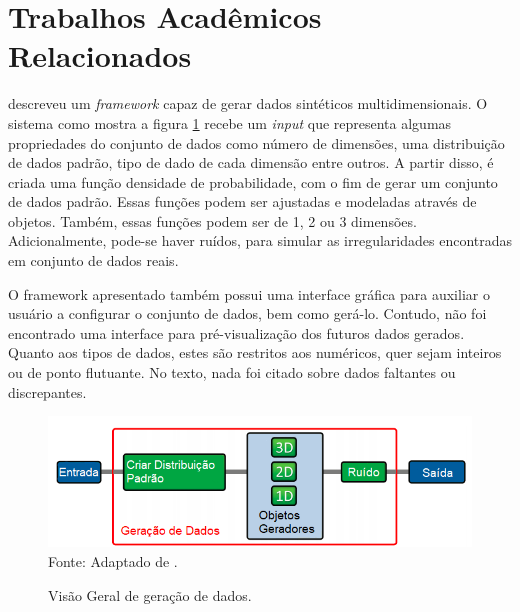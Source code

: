 \documentclass[
	12pt,				%
	openright,			%
	oneside,			%
	a4paper,			%
	english,			%
	brazil				%
	]{abntex2}
\begin{document}
	\section{Trabalhos Acadêmicos Relacionados}
		\cite{albuquerque2011synthetic} descreveu um \emph{framework} capaz de gerar dados sintéticos multidimensionais.
		O sistema como mostra a figura \ref{fig:albuquerque} recebe um \emph{input} que representa algumas propriedades do conjunto de dados como número de dimensões,
			uma distribuição de dados padrão,
			tipo de dado de cada dimensão entre outros.
		A partir disso, é criada uma função densidade de probabilidade, com o fim de gerar um conjunto de dados padrão.
		Essas funções podem ser ajustadas e modeladas através de objetos.
		Também, essas funções podem ser de 1, 2 ou 3 dimensões.
		Adicionalmente, pode-se haver ruídos, para simular as irregularidades encontradas em conjunto de dados reais.
		\par
		O framework apresentado também possui uma interface gráfica para auxiliar o usuário a configurar o conjunto de dados, bem como gerá-lo. 
		Contudo, não foi encontrado uma interface para pré-visualização dos futuros dados gerados.
		Quanto aos tipos de dados, estes são restritos aos numéricos, quer sejam inteiros ou de ponto flutuante.
		No texto, nada foi citado sobre dados faltantes ou discrepantes.    
		\begin{figure}[h!]
			\centering
			\caption{Visão Geral de geração de dados.}
			\includegraphics[width=\linewidth]{./figures/TrabalhosRelacionados/Albuquerque10.png}
			\label{fig:albuquerque}
			\footnotesize Fonte: Adaptado de \cite{albuquerque2011synthetic}.
		\end{figure}
\end{document}
